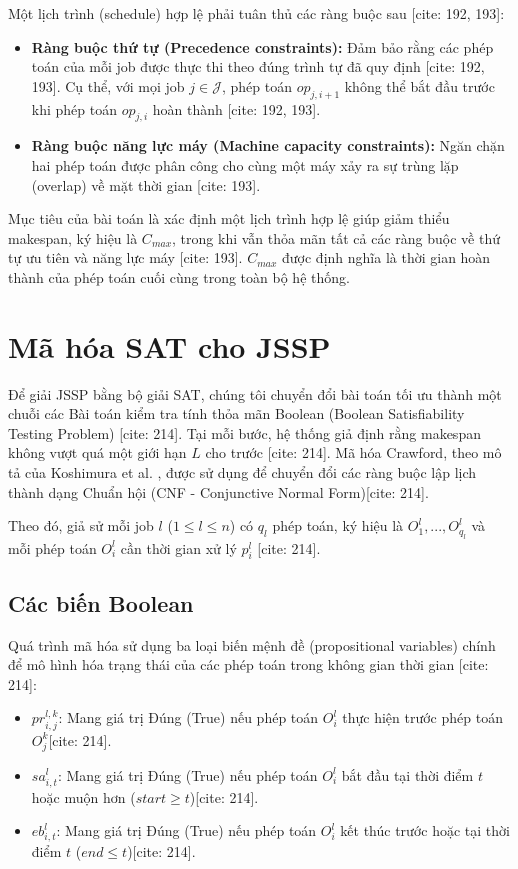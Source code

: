 \documentclass[a4paper,fleqn]{cas-sc} %
\begin{document}
Một lịch trình (schedule) hợp lệ phải tuân thủ các ràng buộc sau \cite{nguyen2026exact}[cite: 192, 193]:
\begin{itemize}
    \item \textbf{Ràng buộc thứ tự (Precedence constraints):} Đảm bảo rằng các phép toán của mỗi job được thực thi theo đúng trình tự đã quy định \cite{nguyen2026exact}[cite: 192, 193]. Cụ thể, với mọi job $j \in \mathcal{J}$, phép toán $op_{j,i+1}$ không thể bắt đầu trước khi phép toán $op_{j,i}$ hoàn thành \cite{nguyen2026exact}[cite: 192, 193].
    \item \textbf{Ràng buộc năng lực máy (Machine capacity constraints):} Ngăn chặn hai phép toán được phân công cho cùng một máy xảy ra sự trùng lặp (overlap) về mặt thời gian \cite{nguyen2026exact}[cite: 193].
\end{itemize}

Mục tiêu của bài toán là xác định một lịch trình hợp lệ giúp giảm thiểu makespan, ký hiệu là $C_{max}$, trong khi vẫn thỏa mãn tất cả các ràng buộc về thứ tự ưu tiên và năng lực máy \cite{nguyen2026exact}[cite: 193]. $C_{max}$ được định nghĩa là thời gian hoàn thành của phép toán cuối cùng trong toàn bộ hệ thống.

\section{Mã hóa SAT cho JSSP}
Để giải JSSP bằng bộ giải SAT, chúng tôi chuyển đổi bài toán tối ưu thành một chuỗi các Bài toán kiểm tra tính thỏa mãn Boolean (Boolean Satisfiability Testing Problem) \cite{koshimura2010solving}[cite: 214]. Tại mỗi bước, hệ thống giả định rằng makespan không vượt quá một giới hạn $L$ cho trước \cite{koshimura2010solving}[cite: 214]. Mã hóa Crawford, theo mô tả của Koshimura et al. \cite{koshimura2010solving}, được sử dụng để chuyển đổi các ràng buộc lập lịch thành dạng Chuẩn hội (CNF - Conjunctive Normal Form)[cite: 214].

Theo đó, giả sử mỗi job $l$ ($1 \le l \le n$) có $q_l$ phép toán, ký hiệu là $O_1^l, ..., O_{q_l}^l$ và mỗi phép toán $O_i^l$ cần thời gian xử lý $p_i^l$ \cite{koshimura2010solving}[cite: 214].

\subsection{Các biến Boolean}
Quá trình mã hóa sử dụng ba loại biến mệnh đề (propositional variables) chính để mô hình hóa trạng thái của các phép toán trong không gian thời gian \cite{koshimura2010solving}[cite: 214]:
\begin{itemize}
    \item $pr_{i,j}^{l,k}$: Mang giá trị Đúng (True) nếu phép toán $O_i^l$ thực hiện trước phép toán $O_j^k$[cite: 214].
    \item $sa_{i,t}^l$: Mang giá trị Đúng (True) nếu phép toán $O_i^l$ bắt đầu tại thời điểm $t$ hoặc muộn hơn ($start \ge t$)[cite: 214].
    \item $eb_{i,t}^l$: Mang giá trị Đúng (True) nếu phép toán $O_i^l$ kết thúc trước hoặc tại thời điểm $t$ ($end \le t$)[cite: 214].
\end{itemize}
\end{document}
